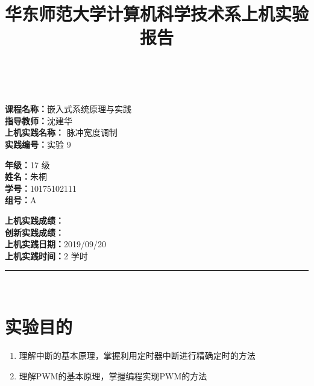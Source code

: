\documentclass[a4paper,10pt,UTF8]{paper}
\title{华东师范大学计算机科学技术系上机实验报告}
\numberwithin{equation}{section}
\numberwithin{figure}{section}
\begin{document}
\pagestyle{fancy}
\lhead{}
\rhead{}
\makeatletter
\def\headrule{{\if@fancyplain\let\headrulewidth\plainheadrulewidth\fi%
\color{gray}\hrule\@height 0.2pt\@width\headwidth}
  \vspace{6mm}}
\makeatother

\newcommand{\HRule}{\rule{\linewidth}{1mm}}
\newcommand{\dai}{\textbf{Dais-CMX16$^+$}}

{ \\ [0.8cm]

\small{
  \begin{minipage}[t]{.32\linewidth}
    \textbf{课程名称：}嵌入式系统原理与实践\\
    \textbf{指导教师：}沈建华\\
    \textbf{上机实践名称：} 脉冲宽度调制\\
    \textbf{实践编号：}实验 9
  \end{minipage}
  \begin{minipage}[t]{.32\linewidth}
    \textbf{年级：}17 级\\
    \textbf{姓名：}朱桐\\
    \textbf{学号：}10175102111\\
    \textbf{组号：}A
  \end{minipage} 
  \begin{minipage}[t]{.32\linewidth}
    \textbf{上机实践成绩：} \\
    \textbf{创新实践成绩：} \\
    \textbf{上机实践日期：}2019/09/20\\
    \textbf{上机实践时间：}2 学时\\
  \end{minipage}
}
\HRule \\[0.5cm]
}

\section{实验目的}

\begin{enumerate}
    \item 理解中断的基本原理，掌握利用定时器中断进行精确定时的方法
    \item 理解PWM的基本原理，掌握编程实现PWM的方法
\end{enumerate}
\end{document}

